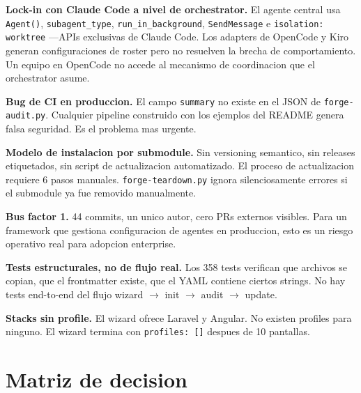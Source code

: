 \documentclass[12pt,a4paper]{article}
\begin{document}
\textbf{Lock-in con Claude Code a nivel de orchestrator.} El agente central usa
\texttt{Agent()}, \texttt{subagent\_type}, \texttt{run\_in\_background},
\texttt{SendMessage} e \texttt{isolation: worktree} ---APIs exclusivas de Claude Code.
Los adapters de OpenCode y Kiro generan configuraciones de roster pero no resuelven
la brecha de comportamiento. Un equipo en OpenCode no accede al mecanismo de
coordinacion que el orchestrator asume.

\textbf{Bug de CI en produccion.} El campo \texttt{summary} no existe en el JSON de
\texttt{forge-audit.py}. Cualquier pipeline construido con los ejemplos del README
genera falsa seguridad. Es el problema mas urgente.

\textbf{Modelo de instalacion por submodule.} Sin versioning semantico, sin releases
etiquetados, sin script de actualizacion automatizado. El proceso de actualizacion
requiere 6 pasos manuales. \texttt{forge-teardown.py} ignora silenciosamente errores
si el submodule ya fue removido manualmente.

\textbf{Bus factor 1.} 44 commits, un unico autor, cero PRs externos visibles. Para
un framework que gestiona configuracion de agentes en produccion, esto es un riesgo
operativo real para adopcion enterprise.

\textbf{Tests estructurales, no de flujo real.} Los 358 tests verifican que archivos
se copian, que el frontmatter existe, que el YAML contiene ciertos strings. No hay
tests end-to-end del flujo wizard $\rightarrow$ init $\rightarrow$ audit $\rightarrow$
update.

\textbf{Stacks sin profile.} El wizard ofrece Laravel y Angular. No existen profiles
para ninguno. El wizard termina con \texttt{profiles: []} despues de 10 pantallas.

\section{Matriz de decision}
\end{document}
